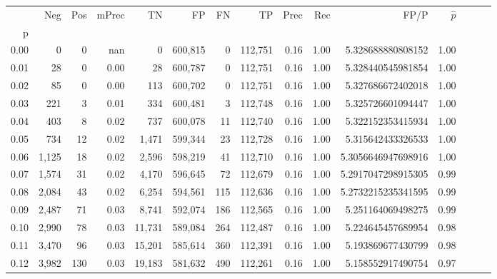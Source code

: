 \begin{tabular}{rrrrrrrrrrrrrrr}
\toprule
{} &     Neg &    Pos & mPrec &       TN &       FP &       FN &       TP &  Prec &   Rec &                   FP/P & $\hat{p}$ \\
p    &         &        &       &          &          &          &          &       &       &                        &           \\
\midrule
0.00 &       0 &      0 &   nan &        0 &  600,815 &        0 &  112,751 &  0.16 &  1.00 &      5.328688880808152 &      1.00 \\
0.01 &      28 &      0 &  0.00 &       28 &  600,787 &        0 &  112,751 &  0.16 &  1.00 &      5.328440545981854 &      1.00 \\
0.02 &      85 &      0 &  0.00 &      113 &  600,702 &        0 &  112,751 &  0.16 &  1.00 &      5.327686672402018 &      1.00 \\
0.03 &     221 &      3 &  0.01 &      334 &  600,481 &        3 &  112,748 &  0.16 &  1.00 &      5.325726601094447 &      1.00 \\
0.04 &     403 &      8 &  0.02 &      737 &  600,078 &       11 &  112,740 &  0.16 &  1.00 &      5.322152353415934 &      1.00 \\
0.05 &     734 &     12 &  0.02 &    1,471 &  599,344 &       23 &  112,728 &  0.16 &  1.00 &      5.315642433326533 &      1.00 \\
0.06 &   1,125 &     18 &  0.02 &    2,596 &  598,219 &       41 &  112,710 &  0.16 &  1.00 &     5.3056646947698916 &      1.00 \\
0.07 &   1,574 &     31 &  0.02 &    4,170 &  596,645 &       72 &  112,679 &  0.16 &  1.00 &     5.2917047298915305 &      0.99 \\
0.08 &   2,084 &     43 &  0.02 &    6,254 &  594,561 &      115 &  112,636 &  0.16 &  1.00 &     5.2732215235341595 &      0.99 \\
0.09 &   2,487 &     71 &  0.03 &    8,741 &  592,074 &      186 &  112,565 &  0.16 &  1.00 &      5.251164069498275 &      0.99 \\
0.10 &   2,990 &     78 &  0.03 &   11,731 &  589,084 &      264 &  112,487 &  0.16 &  1.00 &      5.224645457689954 &      0.98 \\
0.11 &   3,470 &     96 &  0.03 &   15,201 &  585,614 &      360 &  112,391 &  0.16 &  1.00 &      5.193869677430799 &      0.98 \\
0.12 &   3,982 &    130 &  0.03 &   19,183 &  581,632 &      490 &  112,261 &  0.16 &  1.00 &      5.158552917490754 &      0.97 \\

\end{tabular}
